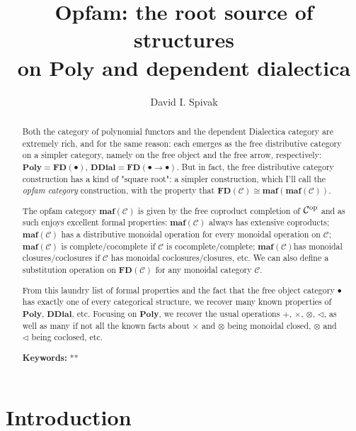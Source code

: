 \documentclass[11pt, one side, article]{memoir}
\theoremstyle{definition}
\theoremstyle{plain}
\newcommand{\cat}[1]{\mathcal{#1}}%
\newcommand{\Cat}[1]{\mathbf{#1}}%
\newcommand{\op}{^\tn{op}}
\newcommand{\tn}[1]{\textnormal{#1}}
\newcommand{\poly}{\Cat{Poly}}
\newcommand{\0}{\Cat{0}}
\newcommand{\1}{\Cat{1}}
\newcommand{\tri}{\mathbin{\triangleleft}}
\newcommand{\fd}{\Cat{FD}}
\newcommand{\opfam}{\Cat{maf}}
\newcommand{\ddial}{\Cat{DDial}}
\begin{document}
\title{Opfam: the root source of structures\\on $\poly$ and dependent dialectica
}

\author{David I. Spivak}

\date{\vspace{-.2in}}

\maketitle

\begin{abstract}
Both the category of polynomial functors and the dependent Dialectica category are extremely rich, and for the same reason: each emerges as the free distributive category on a simpler category, namely on the free object and the free arrow, respectively: $\poly=\fd(\bullet)$, $\ddial=\fd(\bullet\to\bullet)$. But in fact, the free distributive category construction has a kind of "square root": a simpler construction, which I'll call the \emph{opfam category} construction, with the property that $\fd(\cat{C})\cong\opfam(\opfam(\cat{C}))$.

The opfam category $\opfam(\cat{C})$ is given by the free coproduct completion of $\cat{C}\op$ and as such enjoys excellent formal properties: $\opfam(\cat{C})$ always has extensive coproducts; $\opfam(\cat{C})$ has a distributive monoidal operation for every monoidal operation on $\cat{C}$; $\opfam(\cat{C})$ is complete/cocomplete if $\cat{C}$ is cocomplete/complete; $\opfam(\cat{C})$has monoidal closures/coclosures if $\cat{C}$ has monoidal coclosures/closures, etc. We can also define a substitution operation on $\fd(\cat{C})$ for any monoidal category $\cat{C}$. 

From this laundry list of formal properties and the fact that the free object category $\bullet$ has exactly one of every categorical structure, we recover many known properties of $\poly$, $\Cat{DDial}$, etc. Focusing on $\poly$, we recover the usual operations $+$, $\times$, $\otimes$, $\tri$, as well as many if not all the known facts about $\times$ and $\otimes$ being monoidal closed, $\otimes$ and $\tri$ being coclosed, etc.  \\

\smallskip

\noindent
\textbf{Keywords:} **
\end{abstract}

\chapter{Introduction}
\end{document}
